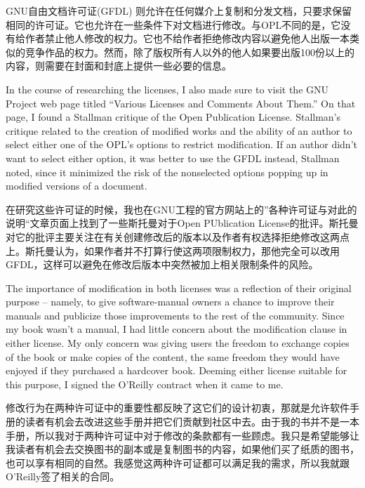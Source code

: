 \ifdefined\chs
GNU自由文档许可证(GFDL) 则允许在任何媒介上复制和分发文档，只要求保留相同的许可证。它也允许在一些条件下对文档进行修改。与OPL不同的是，它没有给作者禁止他人修改的权力。它也不给作者拒绝修改内容以避免他人出版一本类似的竞争作品的权力。然而，除了版权所有人以外的他人如果要出版100份以上的内容，则需要在封面和封底上提供一些必要的信息。
\fi

\ifdefined\eng
In the course of researching the licenses, I also made sure to visit the GNU Project web page titled ``Various Licenses and Comments About Them.'' On that page, I found a Stallman critique of the Open Publication License. Stallman's critique related to the creation of modified works and the ability of an author to select either one of the OPL's options to restrict modification. If an author didn't want to select either option, it was better to use the GFDL instead, Stallman noted, since it minimized the risk of the nonselected options popping up in modified versions of a document.
\fi

\ifdefined\chs
在研究这些许可证的时候，我也在GNU工程的官方网站上的”各种许可证与对此的说明“文章页面上找到了一些斯托曼对于Open PUblication License的批评。斯托曼对它的批评主要关注在有关创建修改后的版本以及作者有权选择拒绝修改这两点上。斯托曼认为，如果作者并不打算行使这两项限制权力，那他完全可以改用GFDL，这样可以避免在修改后版本中突然被加上相关限制条件的风险。
\fi

\ifdefined\eng
The importance of modification in both licenses was a reflection of their original purpose -- namely, to give software-manual owners a chance to improve their manuals and publicize those improvements to the rest of the community. Since my book wasn't a manual, I had little concern about the modification clause in either license. My only concern was giving users the freedom to exchange copies of the book or make copies of the content, the same freedom they would have enjoyed if they purchased a hardcover book. Deeming either license suitable for this purpose, I signed the O'Reilly contract when it came to me.
\fi

\ifdefined\chs
修改行为在两种许可证中的重要性都反映了这它们的设计初衷，那就是允许软件手册的读者有机会去改进这些手册并把它们贡献到社区中去。由于我的书并不是一本手册，所以我对于两种许可证中对于修改的条款都有一些顾虑。我只是希望能够让我读者有机会去交换图书的副本或是复制图书的内容，如果他们买了纸质的图书，也可以享有相同的自然。我感觉这两种许可证都可以满足我的需求，所以我就跟O'Reilly签了相关的合同。
\fi

